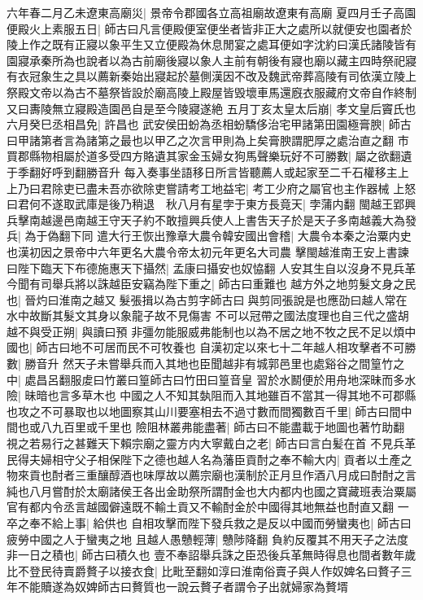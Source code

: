 六年春二月乙未遼東高廟災|{
	景帝令郡國各立高祖廟故遼東有高廟}
夏四月壬子高園便殿火上素服五日|{
	師古曰凡言便殿便室便坐者皆非正大之處所以就便安也園者於陵上作之既有正寢以象平生又立便殿為休息閒宴之處耳便如字沈約曰漢氏諸陵皆有園寢承秦所為也說者以為古前廟後寢以象人主前有朝後有寢也廟以藏主四時祭祀寢有衣冠象生之具以薦新秦始出寢起於墓側漢因不改及魏武帝葬高陵有司依漢立陵上祭殿文帝以為古不墓祭皆設於廟高陵上殿屋皆毁壞車馬還廐衣服藏府文帝自作終制又曰夀陵無立寢殿造園邑自是至今陵寢遂絶}
五月丁亥太皇太后崩|{
	孝文皇后竇氏也}
六月癸巳丞相昌免|{
	許昌也}
武安侯田蚡為丞相蚡驕侈治宅甲諸第田園極膏腴|{
	師古曰甲諸第者言為諸第之最也以甲乙之次言甲則為上矣膏腴謂肥厚之處治直之翻}
市買郡縣物相屬於道多受四方賂遺其家金玉婦女狗馬聲樂玩好不可勝數|{
	屬之欲翻遺于季翻好呼到翻勝音升}
每入奏事坐語移日所言皆聽薦人或起家至二千石權移主上上乃曰君除吏已盡未吾亦欲除吏嘗請考工地益宅|{
	考工少府之屬官也主作器械}
上怒曰君何不遂取武庫是後乃稍退　秋八月有星孛于東方長竟天|{
	孛蒲内翻}
閩越王郢興兵擊南越邊邑南越王守天子約不敢擅興兵使人上書吿天子於是天子多南越義大為發兵|{
	為于偽翻下同}
遣大行王恢出豫章大農令韓安國出會稽|{
	大農令本秦之治粟内史也漢初因之景帝中六年更名大農令帝太初元年更名大司農}
擊閩越淮南王安上書諫曰陛下臨天下布德施惠天下攝然|{
	孟康曰攝安也奴恊翻}
人安其生自以沒身不見兵革今聞有司舉兵將以誅越臣安竊為陛下重之|{
	師古曰重難也}
越方外之地剪髮文身之民也|{
	晉灼曰淮南之越又髮張揖以為古剪字師古曰與剪同張說是也應劭曰越人常在水中故斷其髮文其身以象龍子故不見傷害}
不可以冠帶之國法度理也自三代之盛胡越不與受正朔|{
	與讀曰預}
非彊勿能服威弗能制也以為不居之地不牧之民不足以煩中國也|{
	師古曰地不可居而民不可牧養也}
自漢初定以來七十二年越人相攻擊者不可勝數|{
	勝音升}
然天子未嘗舉兵而入其地也臣聞越非有城郭邑里也處谿谷之間篁竹之中|{
	處昌呂翻服䖍曰竹叢曰篁師古曰竹田曰篁音皇}
習於水鬭便於用舟地深昧而多水險|{
	昧暗也言多草木也}
中國之人不知其埶阻而入其地雖百不當其一得其地不可郡縣也攻之不可暴取也以地圖察其山川要塞相去不過寸數而間獨數百千里|{
	師古曰間中間也或八九百里或千里也}
險阻林叢弗能盡著|{
	師古曰不能盡載于地圖也著竹助翻}
視之若易行之甚難天下賴宗廟之靈方内大寧戴白之老|{
	師古曰言白髪在首}
不見兵革民得夫婦相守父子相保陛下之德也越人名為藩臣貢酎之奉不輸大内|{
	貢者以土產之物來貢也酎者三重釀醇酒也味厚故以薦宗廟也漢制於正月旦作酒八月成曰酎酎之言純也八月嘗酎於太廟諸侯王各出金助祭所謂酎金也大内都内也國之寶藏班表治粟屬官有都内令丞言越國僻遠既不輸土貢又不輸酎金於中國得其地無益也酎直又翻}
一卒之奉不給上事|{
	給供也}
自相攻擊而陛下發兵救之是反以中國而勞蠻夷也|{
	師古曰疲勞中國之人于蠻夷之地}
且越人愚戇輕薄|{
	戇陟降翻}
負約反覆其不用天子之法度非一日之積也|{
	師古曰積久也}
壹不奉詔舉兵誅之臣恐後兵革無時得息也間者數年歲比不登民待賣爵贅子以接衣食|{
	比毗至翻如淳曰淮南俗賣子與人作奴婢名曰贅子三年不能贖遂為奴婢師古曰贅質也一說云贅子者謂令子出就婦家為贅壻}
